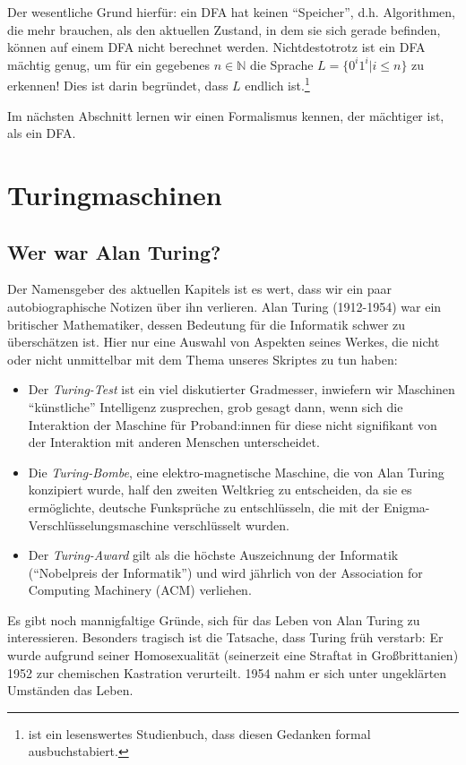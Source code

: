 Der wesentliche Grund hierfür: ein DFA hat keinen ``Speicher'',
d.h. Algorithmen, die mehr brauchen, als den aktuellen Zustand,
in dem sie sich gerade befinden,
können auf einem DFA nicht berechnet werden.
Nichtdestotrotz ist ein DFA mächtig genug,
um für ein gegebenes $n \in \mathbb{N}$ die Sprache
$L = \{0^i1^i| i \leq n\}$ zu erkennen!
Dies ist darin begründet,
dass $L$ endlich ist.\footnote{
    \cite{aul} ist ein lesenswertes Studienbuch, dass diesen Gedanken formal ausbuchstabiert.
}

Im nächsten Abschnitt lernen wir einen Formalismus kennen,
der mächtiger ist, als ein DFA.

\section{Turingmaschinen}
\subsection{Wer war Alan Turing?}
Der Namensgeber des aktuellen Kapitels ist es wert,
dass wir ein paar autobiographische Notizen über ihn verlieren.
Alan Turing (1912-1954) war ein britischer Mathematiker,
dessen Bedeutung für die Informatik schwer zu überschätzen ist.
Hier nur eine Auswahl von Aspekten seines Werkes,
die nicht oder nicht unmittelbar mit dem Thema unseres Skriptes zu tun haben:
\begin{itemize}
    \item Der \emph{Turing-Test} ist ein viel diskutierter Gradmesser,
        inwiefern wir Maschinen ``künstliche'' Intelligenz zusprechen,
        grob gesagt dann, wenn sich die Interaktion der Maschine für Proband:innen
        für diese nicht signifikant von der Interaktion mit anderen Menschen unterscheidet.
    \item Die \emph{Turing-Bombe}, eine elektro-magnetische Maschine,
        die von Alan Turing konzipiert wurde,
        half den zweiten Weltkrieg zu entscheiden,
        da sie es ermöglichte,
        deutsche Funksprüche zu entschlüsseln,
        die mit der Enigma-Verschlüsselungsmaschine verschlüsselt wurden.
    \item Der \emph{Turing-Award} gilt als die höchste Auszeichnung der Informatik
        (``Nobelpreis der Informatik'') und wird jährlich von der
        Association for Computing Machinery (ACM) verliehen.
\end{itemize}
Es gibt noch mannigfaltige Gründe,
sich für das Leben von Alan Turing zu interessieren.
Besonders tragisch ist die Tatsache,
dass Turing früh verstarb:
Er wurde aufgrund seiner Homosexualität (seinerzeit eine Straftat in Großbrittanien)
1952 zur chemischen Kastration verurteilt.
1954 nahm er sich unter ungeklärten Umständen das Leben.

